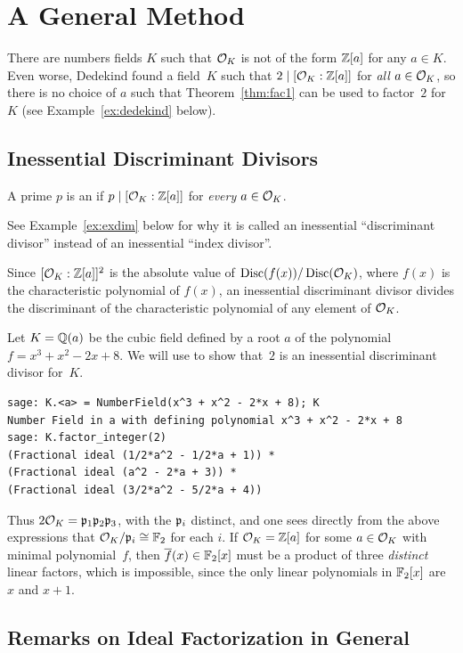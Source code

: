\section{A General Method}
There are numbers fields $K$ such that $\mathcal{O}_K$ is not of the form
$\mathbb{Z}[a]$ for any $a\in K$.  Even worse, Dedekind found a
field~$K$ such that $2\mid [\mathcal{O}_K : \mathbb{Z}[a]]$ for {\em all}
$a\in \mathcal{O}_K$, so there is no choice of $a$ such that
Theorem~\ref{thm:fac1} can be used to factor~$2$ for $K$ (see
Example~\ref{ex:dedekind} below).

\subsection{Inessential Discriminant Divisors}
\begin{definition}
A prime $p$ is an  if $p\mid [\mathcal{O}_K : \mathbb{Z}[a]]$ for
{\em every} $a\in\mathcal{O}_K$.
\end{definition}
See Example~\ref{ex:exdim} below for
why it is called an inessential ``discriminant divisor'' instead
of an inessential ``index divisor''.

Since $[\mathcal{O}_K : \mathbb{Z}[a]]^2$ is the absolute value of
$\operatorname{Disc}(f(x))/\operatorname{Disc}(\mathcal{O}_K)$, where $f(x)$ is the characteristic
polynomial of $f(x)$, an inessential discriminant divisor divides the
discriminant of the characteristic polynomial of any element of
$\mathcal{O}_K$.

\begin{example}[Dedekind]\label{ex:dedekind}
Let $K=\mathbb{Q}(a)$ be the cubic field defined by a root $a$ of the polynomial
$f = x^3 + x^2 - 2x+8$.  We will use \sage to show that~$2$ is an inessential
discriminant divisor for~$K$.
\begin{verbatim}
sage: K.<a> = NumberField(x^3 + x^2 - 2*x + 8); K
Number Field in a with defining polynomial x^3 + x^2 - 2*x + 8
sage: K.factor_integer(2)
(Fractional ideal (1/2*a^2 - 1/2*a + 1)) *
(Fractional ideal (a^2 - 2*a + 3)) *
(Fractional ideal (3/2*a^2 - 5/2*a + 4))
\end{verbatim}
Thus $2\mathcal{O}_K=\mathfrak{p}_1\mathfrak{p}_2\mathfrak{p}_3$, with the $\mathfrak{p}_i$ distinct,
and one sees directly from the above expressions
that
$\mathcal{O}_K/\mathfrak{p}_i\cong \mathbb{F}_2$ for each $i$.  If $\mathcal{O}_K=\mathbb{Z}[a]$
for some $a\in\mathcal{O}_K$ with minimal polynomial~$f$, then
$\overline{f}(x)\in\mathbb{F}_2[x]$ must be a product of three {\em distinct}
linear factors, which is impossible, since the only
linear polynomials in $\mathbb{F}_2[x]$ are $x$ and $x+1$.
\end{example}

\subsection{Remarks on Ideal Factorization in General}

